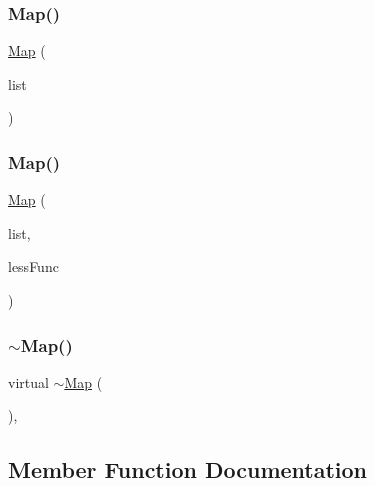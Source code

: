 \mbox{\label{classMap_a79fa612ecdfc84da8a66341c76e6bd85}} 
\subsubsection{\texorpdfstring{Map()}{Map()}\hspace{0.1cm}{\footnotesize\ttfamily [3/4]}}
{\footnotesize\ttfamily \mbox{\hyperlink{classMap}{Map}} (\begin{DoxyParamCaption}\item[{std\+::initializer\+\_\+list$<$ std\+::pair$<$ const Key\+Type, Value\+Type $>$$>$}]{list }\end{DoxyParamCaption})}

\mbox{\label{classMap_a67384221d4d1bf326b8fd854488e2264}} 
\subsubsection{\texorpdfstring{Map()}{Map()}\hspace{0.1cm}{\footnotesize\ttfamily [4/4]}}
{\footnotesize\ttfamily \mbox{\hyperlink{classMap}{Map}} (\begin{DoxyParamCaption}\item[{std\+::initializer\+\_\+list$<$ std\+::pair$<$ const Key\+Type, Value\+Type $>$$>$}]{list,  }\item[{std\+::function$<$ bool(const Key\+Type \&, const Key\+Type \&)$>$}]{less\+Func }\end{DoxyParamCaption})}

\mbox{\label{classMap_aa23229d7196c7a4b09cb605b419acc3b}} 
\subsubsection{\texorpdfstring{$\sim$\+Map()}{~Map()}}
{\footnotesize\ttfamily virtual $\sim$\mbox{\hyperlink{classMap}{Map}} (\begin{DoxyParamCaption}{ }\end{DoxyParamCaption})\hspace{0.3cm}{\ttfamily [virtual]}, {\ttfamily [default]}}



\subsection{Member Function Documentation}
\mbox{\label{classMap_a9129d6095063e7e14d85c627d35086a5}} 
